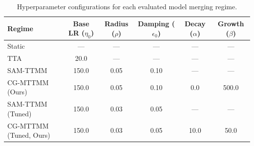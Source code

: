 \documentclass{article}
\theoremstyle{plain}
\theoremstyle{definition}
\theoremstyle{remark}
\begin{document}
\begin{table}[H]
\caption{Hyperparameter configurations for each evaluated model merging regime.}
\label{tab:hyperparameters_spec}
\centering
\begin{tabular}{lccccc}
\toprule
\textbf{Regime} & \textbf{Base LR ($\eta_0$)} & \textbf{Radius ($\rho$)} & \textbf{Damping ($\epsilon_0$)} & \textbf{Decay ($\alpha$)} & \textbf{Growth ($\beta$)} \\
\midrule
Static           & ---                       & ---                                 & ---                                & ---                            & ---                            \\
TTA              & 20.0                      & ---                                 & ---                                & ---                            & ---                            \\
SAM-TTMM         & 150.0                     & 0.05                                & 0.10                               & ---                            & ---                            \\
CG-MTTMM (Ours)  & 150.0                     & 0.05                                & 0.10                               & 0.0                            & 500.0                          \\
SAM-TTMM (Tuned) & 150.0                     & 0.03                                & 0.05                               & ---                            & ---                            \\
CG-MTTMM (Tuned, Ours) & 150.0               & 0.03                                & 0.05                               & 10.0                           & 50.0                           \\
\bottomrule
\end{tabular}
\end{table}
\end{document}
